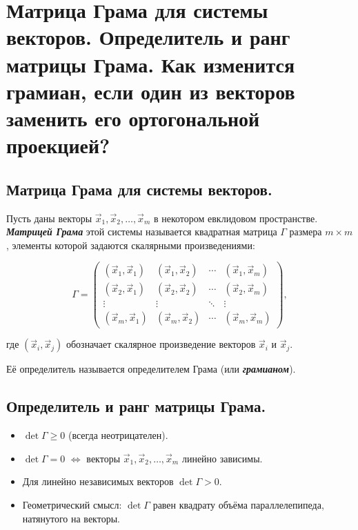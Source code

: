 \section{
    Матрица Грама для системы векторов. Определитель и ранг матрицы Грама. Как изменится грамиан, если один из векторов заменить его ортогональной проекцией?
}

\subsection{
    Матрица Грама для системы векторов.
}
    
\begin{definition}
    Пусть даны векторы \( \vec{x}_1, \vec{x}_2, \dots, \vec{x}_m \) в некотором евклидовом пространстве. \textit{\textbf{Матрицей Грама}} этой системы называется квадратная матрица \( \Gamma \) размера \( m \times m \), элементы которой задаются скалярными произведениями:

    \[
    \Gamma = \begin{pmatrix}
    (\vec{x}_1, \vec{x}_1) & (\vec{x}_1, \vec{x}_2) & \cdots & (\vec{x}_1, \vec{x}_m) \\
    (\vec{x}_2, \vec{x}_1) & (\vec{x}_2, \vec{x}_2) & \cdots & (\vec{x}_2, \vec{x}_m) \\
    \vdots     & \vdots     & \ddots & \vdots     \\
    (\vec{x}_m, \vec{x}_1) & (\vec{x}_m, \vec{x}_2) & \cdots & (\vec{x}_m, \vec{x}_m)
    \end{pmatrix},
    \]
    
    где \( (\vec{x}_i, \vec{x}_j) \) обозначает скалярное произведение векторов \( \vec{x}_i \) и \( \vec{x}_j \).
\end{definition}

Её определитель называется определителем Грама (или \textbf{\textit{грамианом}}).


\subsection{
    Определитель и ранг матрицы Грама.
}


\begin{itemize}
\item $\det \Gamma \geq 0$ (всегда неотрицателен).
\item $\det \Gamma = 0$ $\iff$ векторы $\vec{x}_1, \vec{x}_2, \dots, \vec{x}_m$ линейно зависимы.
\item Для линейно независимых векторов $\det \Gamma > 0$.
\item Геометрический смысл: $\det \Gamma$ равен квадрату объёма параллелепипеда, натянутого на векторы.
\end{itemize}

